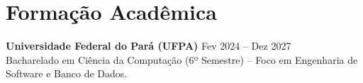 \section*{Formação Acadêmica}
\textbf{Universidade Federal do Pará (UFPA)} \hfill Fev 2024 -- Dez 2027 \\
Bacharelado em Ciência da Computação (6º Semestre) -- Foco em Engenharia de Software e Banco de Dados.